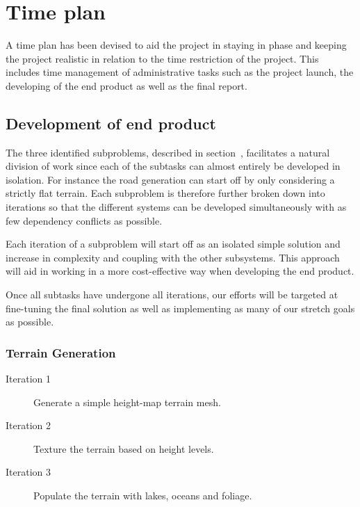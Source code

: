 \section{Time plan}
%

A time plan has been devised to aid the project in staying in phase and keeping the project realistic in relation to the time restriction of the project.
This includes time management of administrative tasks such as the project launch, the developing of the end product as well as the final report.

\subsection{Development of end product}
The three identified subproblems, described in section~, facilitates a natural division of work since each of the subtasks can almost entirely be developed in isolation.
For instance the road generation can start off by only considering a strictly flat terrain.
Each subproblem is therefore further broken down into iterations so that the different systems can be developed simultaneously with as few dependency conflicts as possible.

Each iteration of a subproblem will start off as an isolated simple solution and increase in complexity and coupling with the other subsystems.
This approach will aid in working in a more cost-effective way when developing the end product.

Once all subtasks have undergone all iterations, our efforts will be targeted at fine-tuning the final solution as well as implementing as many of our stretch goals as possible.

\subsubsection{Terrain Generation}
\begin{description}
  \item[Iteration 1] Generate a simple height-map terrain mesh.
  \item[Iteration 2] Texture the terrain based on height levels.
  \item[Iteration 3] Populate the terrain with lakes, oceans and foliage.
\end{description}

